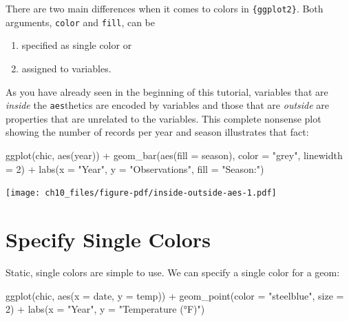 \documentclass[
  letterpaper,
  DIV=11,
  numbers=noendperiod]{scrreprt}
\newenvironment{Shaded}{\begin{snugshade}}{\end{snugshade}}
\newcommand{\AttributeTok}[1]{\textcolor[rgb]{0.40,0.45,0.13}{#1}}
\newcommand{\DecValTok}[1]{\textcolor[rgb]{0.68,0.00,0.00}{#1}}
\newcommand{\FunctionTok}[1]{\textcolor[rgb]{0.28,0.35,0.67}{#1}}
\newcommand{\NormalTok}[1]{\textcolor[rgb]{0.00,0.23,0.31}{#1}}
\newcommand{\SpecialCharTok}[1]{\textcolor[rgb]{0.37,0.37,0.37}{#1}}
\newcommand{\StringTok}[1]{\textcolor[rgb]{0.13,0.47,0.30}{#1}}
\providecommand{\tightlist}{%
  \setlength{\itemsep}{0pt}\setlength{\parskip}{0pt}}\usepackage{longtable,booktabs,array}
\begin{document}
There are two main differences when it comes to colors in
\texttt{\{ggplot2\}}. Both arguments, \texttt{color} and \texttt{fill},
can be

\begin{enumerate}
\def\labelenumi{\arabic{enumi}.}
\tightlist
\item
  specified as single color or
\item
  assigned to variables.
\end{enumerate}

As you have already seen in the beginning of this tutorial, variables
that are \emph{inside} the \texttt{aes}thetics are encoded by variables
and those that are \emph{outside} are properties that are unrelated to
the variables. This complete nonsense plot showing the number of records
per year and season illustrates that fact:

\begin{Shaded}
\begin{Highlighting}[]
\FunctionTok{ggplot}\NormalTok{(chic, }\FunctionTok{aes}\NormalTok{(year)) }\SpecialCharTok{+}
  \FunctionTok{geom\_bar}\NormalTok{(}\FunctionTok{aes}\NormalTok{(}\AttributeTok{fill =}\NormalTok{ season), }\AttributeTok{color =} \StringTok{"grey"}\NormalTok{, }\AttributeTok{linewidth =} \DecValTok{2}\NormalTok{) }\SpecialCharTok{+}
  \FunctionTok{labs}\NormalTok{(}\AttributeTok{x =} \StringTok{"Year"}\NormalTok{, }\AttributeTok{y =} \StringTok{"Observations"}\NormalTok{, }\AttributeTok{fill =} \StringTok{"Season:"}\NormalTok{)}
\end{Highlighting}
\end{Shaded}

\texttt{[image: ch10\_files/figure-pdf/inside-outside-aes-1.pdf]}

\section{Specify Single Colors}\label{specify-single-colors}

Static, single colors are simple to use. We can specify a single color
for a geom:

\begin{Shaded}
\begin{Highlighting}[]
\FunctionTok{ggplot}\NormalTok{(chic, }\FunctionTok{aes}\NormalTok{(}\AttributeTok{x =}\NormalTok{ date, }\AttributeTok{y =}\NormalTok{ temp)) }\SpecialCharTok{+}
  \FunctionTok{geom\_point}\NormalTok{(}\AttributeTok{color =} \StringTok{"steelblue"}\NormalTok{, }\AttributeTok{size =} \DecValTok{2}\NormalTok{) }\SpecialCharTok{+}
  \FunctionTok{labs}\NormalTok{(}\AttributeTok{x =} \StringTok{"Year"}\NormalTok{, }\AttributeTok{y =} \StringTok{"Temperature (°F)"}\NormalTok{)}
\end{Highlighting}
\end{Shaded}
\end{document}
